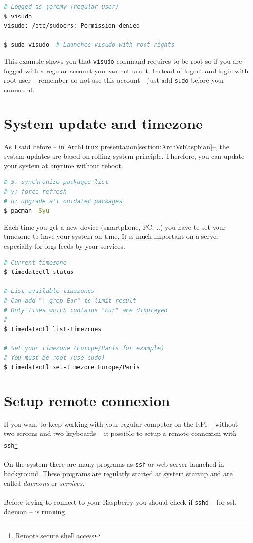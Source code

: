 \begin{lstlisting}[language=bash,caption=sudo command usage]
# Logged as jeremy (regular user)
$ visudo
visudo: /etc/sudoers: Permission denied

$ sudo visudo  # Launches visudo with root rights
\end{lstlisting}

This example shows you that \texttt{visudo} command requires to be root so if 
you are logged with a regular account you can not use it. Instead of logout and 
login with root user -- remember do not use this account -- just add 
\texttt{sudo} before your command.

\section{System update and timezone}
As I said before -- in ArchLinux presentation\ref{section:ArchVsRaspbian}--, the 
system updates are based on rolling system principle. Therefore, you can update 
your system at anytime without reboot.

\begin{lstlisting}[language=bash,caption=Update ArchLinux]
# S: synchronize packages list
# y: force refresh
# u: upgrade all outdated packages
$ pacman -Syu
\end{lstlisting}

Each time you get a new device (smartphone, PC, ..) you have to set your timezone 
to have your system on time. It is much important on a server especially for 
logs feeds by your services.

\begin{lstlisting}[language=bash,caption=Set your timezone]
# Current timezone
$ timedatectl status

# List available timezones
# Can add "| grep Eur" to limit result
# Only lines which contains "Eur" are displayed
#
$ timedatectl list-timezones

# Set your timezone (Europe/Paris for example)
# You must be root (use sudo)
$ timedatectl set-timezone Europe/Paris
\end{lstlisting}

\section{Setup remote connexion}
If you want to keep working with your regular computer on the RPi -- without two 
screens and two keyboards -- it possible to setup a remote connexion with 
\texttt{ssh}\footnote{Remote secure shell access}.
\\\\
On the system there are many programs as \texttt{ssh} or web server launched 
in background. These programs are regularly started at system startup and 
are called \emph{daemons} or \emph{services}. 
\\\\
Before trying to connect to your Raspberry you should check if \texttt{sshd} 
-- for ssh daemon -- is running.

